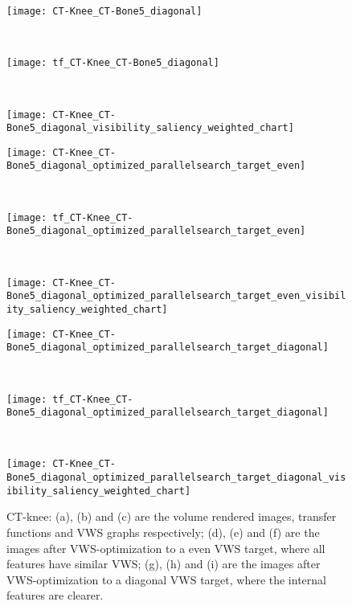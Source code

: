 \begin{figure}
	\centering
	\begin{minipage}{.9\textwidth}%
		\begin{minipage}{.3\textwidth}
			\texttt{[image: CT-Knee\_CT-Bone5\_diagonal]}
			\subcaption{}
		\end{minipage}~
		\begin{minipage}{.3\textwidth}
			\texttt{[image: tf\_CT-Knee\_CT-Bone5\_diagonal]}
			\subcaption{}
		\end{minipage}~
		\begin{minipage}{.4\textwidth}
			\texttt{[image: CT-Knee\_CT-Bone5\_diagonal\_visibility\_saliency\_weighted\_chart]}
			\subcaption{}
		\end{minipage}
		
		\begin{minipage}{.3\textwidth}
			\texttt{[image: CT-Knee\_CT-Bone5\_diagonal\_optimized\_parallelsearch\_target\_even]}
			\subcaption{}
		\end{minipage}~
		\begin{minipage}{.3\textwidth}
			\texttt{[image: tf\_CT-Knee\_CT-Bone5\_diagonal\_optimized\_parallelsearch\_target\_even]}
			\subcaption{}
		\end{minipage}~
		\begin{minipage}{.4\textwidth}
			\texttt{[image: CT-Knee\_CT-Bone5\_diagonal\_optimized\_parallelsearch\_target\_even\_visibility\_saliency\_weighted\_chart]}
			\subcaption{}
		\end{minipage}
		
		\begin{minipage}{.3\textwidth}
			\texttt{[image: CT-Knee\_CT-Bone5\_diagonal\_optimized\_parallelsearch\_target\_diagonal]}
			\subcaption{}
		\end{minipage}~
		\begin{minipage}{.3\textwidth}
			\texttt{[image: tf\_CT-Knee\_CT-Bone5\_diagonal\_optimized\_parallelsearch\_target\_diagonal]}
			\subcaption{}
		\end{minipage}~
		\begin{minipage}{.4\textwidth}
			\texttt{[image: CT-Knee\_CT-Bone5\_diagonal\_optimized\_parallelsearch\_target\_diagonal\_visibility\_saliency\_weighted\_chart]}
			\subcaption{}
		\end{minipage}
	\end{minipage}
	\caption[CT-Knee: volume rendered images, transfer functions and VWS graphs]{CT-knee: (a), (b) and (c) are the volume rendered images, transfer functions and VWS graphs respectively; (d), (e) and (f) are the images after VWS-optimization to a even VWS target, where all features have similar VWS; (g), (h) and (i) are the images after VWS-optimization to a diagonal VWS target, where the internal features are clearer.
	}
	\label{fig:CT-Knee_CT-Bone5_diagonal}
\end{figure}
